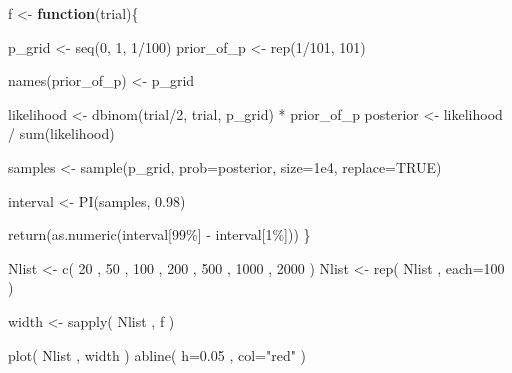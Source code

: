 \documentclass[
]{article}
\newenvironment{Shaded}{\begin{snugshade}}{\end{snugshade}}
\newcommand{\AttributeTok}[1]{\textcolor[rgb]{0.77,0.63,0.00}{#1}}
\newcommand{\ConstantTok}[1]{\textcolor[rgb]{0.00,0.00,0.00}{#1}}
\newcommand{\ControlFlowTok}[1]{\textcolor[rgb]{0.13,0.29,0.53}{\textbf{#1}}}
\newcommand{\DecValTok}[1]{\textcolor[rgb]{0.00,0.00,0.81}{#1}}
\newcommand{\FloatTok}[1]{\textcolor[rgb]{0.00,0.00,0.81}{#1}}
\newcommand{\FunctionTok}[1]{\textcolor[rgb]{0.00,0.00,0.00}{#1}}
\newcommand{\NormalTok}[1]{#1}
\newcommand{\OtherTok}[1]{\textcolor[rgb]{0.56,0.35,0.01}{#1}}
\newcommand{\SpecialCharTok}[1]{\textcolor[rgb]{0.00,0.00,0.00}{#1}}
\newcommand{\StringTok}[1]{\textcolor[rgb]{0.31,0.60,0.02}{#1}}
\begin{document}
\begin{Shaded}
\begin{Highlighting}[]
\NormalTok{f }\OtherTok{\textless{}{-}} \ControlFlowTok{function}\NormalTok{(trial)\{}
  
\NormalTok{  p\_grid }\OtherTok{\textless{}{-}} \FunctionTok{seq}\NormalTok{(}\DecValTok{0}\NormalTok{, }\DecValTok{1}\NormalTok{, }\DecValTok{1}\SpecialCharTok{/}\DecValTok{100}\NormalTok{)}
\NormalTok{  prior\_of\_p }\OtherTok{\textless{}{-}} \FunctionTok{rep}\NormalTok{(}\DecValTok{1}\SpecialCharTok{/}\DecValTok{101}\NormalTok{, }\DecValTok{101}\NormalTok{)}
  
  \FunctionTok{names}\NormalTok{(prior\_of\_p) }\OtherTok{\textless{}{-}}\NormalTok{ p\_grid}

  
\NormalTok{  likelihood }\OtherTok{\textless{}{-}} \FunctionTok{dbinom}\NormalTok{(trial}\SpecialCharTok{/}\DecValTok{2}\NormalTok{, trial, p\_grid) }\SpecialCharTok{*}\NormalTok{ prior\_of\_p}
\NormalTok{  posterior }\OtherTok{\textless{}{-}}\NormalTok{ likelihood }\SpecialCharTok{/} \FunctionTok{sum}\NormalTok{(likelihood)}
  
\NormalTok{  samples }\OtherTok{\textless{}{-}} \FunctionTok{sample}\NormalTok{(p\_grid, }\AttributeTok{prob=}\NormalTok{posterior, }\AttributeTok{size=}\FloatTok{1e4}\NormalTok{, }\AttributeTok{replace=}\ConstantTok{TRUE}\NormalTok{) }
  
\NormalTok{  interval }\OtherTok{\textless{}{-}} \FunctionTok{PI}\NormalTok{(samples, }\FloatTok{0.98}\NormalTok{)}
  
  \FunctionTok{return}\NormalTok{(}\FunctionTok{as.numeric}\NormalTok{(interval[}\StringTok{\textquotesingle{}99\%\textquotesingle{}}\NormalTok{] }\SpecialCharTok{{-}}\NormalTok{ interval[}\StringTok{\textquotesingle{}1\%\textquotesingle{}}\NormalTok{]))}
\NormalTok{\}}

\NormalTok{Nlist }\OtherTok{\textless{}{-}} \FunctionTok{c}\NormalTok{( }\DecValTok{20}\NormalTok{ , }\DecValTok{50}\NormalTok{ , }\DecValTok{100}\NormalTok{ , }\DecValTok{200}\NormalTok{ , }\DecValTok{500}\NormalTok{ , }\DecValTok{1000}\NormalTok{ , }\DecValTok{2000}\NormalTok{ )}
\NormalTok{Nlist }\OtherTok{\textless{}{-}} \FunctionTok{rep}\NormalTok{( Nlist , }\AttributeTok{each=}\DecValTok{100}\NormalTok{ )}

\NormalTok{width }\OtherTok{\textless{}{-}} \FunctionTok{sapply}\NormalTok{( Nlist , f )}

\FunctionTok{plot}\NormalTok{( Nlist , width )}
\FunctionTok{abline}\NormalTok{( }\AttributeTok{h=}\FloatTok{0.05}\NormalTok{ , }\AttributeTok{col=}\StringTok{"red"}\NormalTok{ )}
\end{Highlighting}
\end{Shaded}
\end{document}
